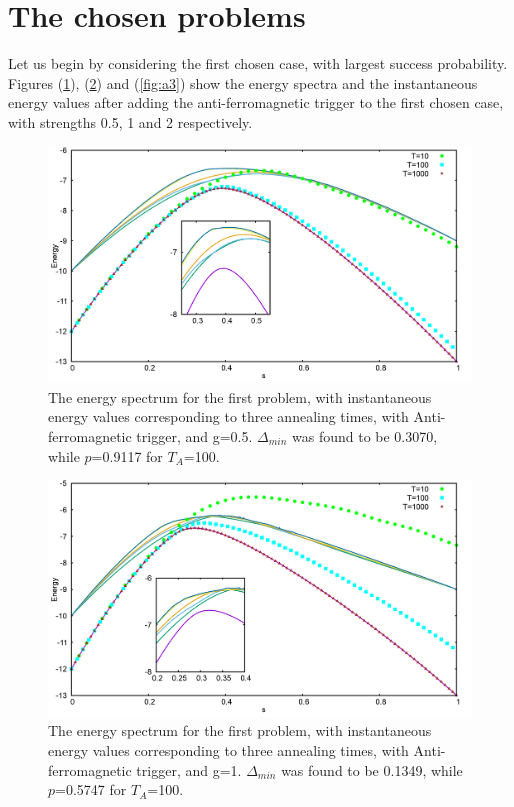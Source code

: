 \documentclass[../main.tex]{subfiles}
\begin{document}
\section*{The chosen problems}
Let us begin by considering the first chosen case, with largest success probability. \\
Figures (\ref{fig:a1}), (\ref{fig:a2}) and (\ref{fig:a3}) show the energy spectra and the instantaneous energy values after adding the anti-ferromagnetic trigger to the first chosen case, with strengths 0.5, 1 and 2 respectively.
\begin{figure}[H]
\centering 
\includegraphics[scale=0.3]{733_s12_A_g0.png}
\caption{The energy spectrum for the first problem, with instantaneous energy values corresponding to three annealing times, with Anti-ferromagnetic trigger, and g=0.5. $\Delta_{min}$ was found to be 0.3070, while $p$=0.9117 for $T_A$=100. }
\label{fig:a1}
\end{figure}
\begin{figure}[H]
\centering 
\includegraphics[scale=0.3]{733_s12_A_g1.png}
\caption{The energy spectrum for the first problem, with instantaneous energy values corresponding to three annealing times, with Anti-ferromagnetic trigger, and g=1. $\Delta_{min}$ was found to be 0.1349, while $p$=0.5747 for $T_A$=100. }
\label{fig:a2}
\end{figure}
\end{document}
